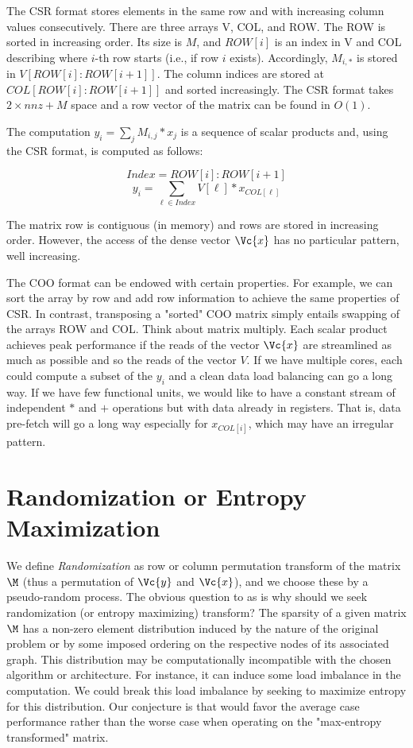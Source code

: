 \documentclass[manuscript,screen]{acmart}
\begin{document}
The CSR format stores elements in the same row and with increasing
column values consecutively. There are three arrays V, COL, and
ROW. The ROW is sorted in increasing order.  Its size is $M$, and
$ROW[i]$ is an index in V and COL describing where $i$-th row starts
(i.e., if row $i$ exists).  Accordingly, $M_{i,*}$ is stored in
$V[ROW[i]:ROW[i+1]]$. The column indices are stored at
$COL[ROW[i]:ROW[i+1]]$ and sorted increasingly. The CSR format takes
$2\times nnz + M$ space and a row vector of the matrix can be found in
$O(1)$.

The computation  $y_i = \sum_j M_{i,j}*x_j$ is a sequence of scalar
products and, using the CSR format, is computed as follows:

\[ Index = ROW[i]:ROW[i+1] \]
\[
y_i =  \sum_{\ell\in Index} V[\ell] * x_{COL[\ell]}  
\]

The matrix row is contiguous (in memory) and rows are stored in
increasing order. However, the access of the dense vector $\Vc{x}$ has
no particular pattern, well increasing.

The COO format can be endowed with certain properties. For example, we
can sort the array by row and add row information to achieve the same
properties of CSR. In contrast, transposing a "sorted" COO matrix
simply entails swapping of the arrays ROW and COL. Think about matrix
multiply.  Each scalar product achieves peak performance if the reads
of the vector $\Vc{x}$ are streamlined as much as possible and so the
reads of the vector $V$. If we have multiple cores, each could compute
a subset of the $y_i$ and a clean data load balancing can go a long
way. If we have few functional units, we would like to have a constant
stream of independent $*$ and $+$ operations but with data already in
registers. That is, data pre-fetch will go a long way especially for
$x_{COL[i]}$, which may have an irregular pattern.


\section{Randomization or Entropy Maximization}
\label{sec:randomization}
We define {\em Randomization} as row or column permutation transform
of the matrix $\M$ (thus a permutation of $\Vc{y}$ and $\Vc{x}$), and
we choose these by a pseudo-random process. The obvious question to as
is why should we seek randomization (or entropy maximizing) transform?
The sparsity of a given matrix $\M$ has a non-zero element
distribution induced by the nature of the original problem or by some
imposed ordering on the respective nodes of its associated graph.
This distribution may be computationally incompatible with the chosen
algorithm or architecture. For instance, it can induce some load
imbalance in the computation.  We could break this load imbalance by
seeking to maximize entropy for this distribution. Our conjecture is
that would favor the average case performance rather than the worse
case when operating on the "max-entropy transformed" matrix.
\end{document}
